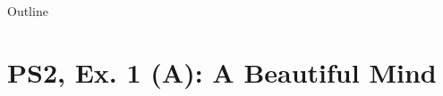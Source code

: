 

\maketitle

\begin{frame}{Outline}
\tableofcontents
\end{frame}


\section{PS2, Ex. 1 (A): A Beautiful Mind}

